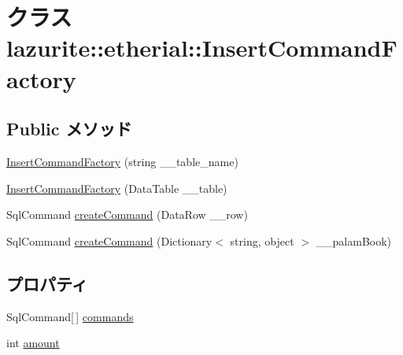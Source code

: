 \hypertarget{classlazurite_1_1etherial_1_1_insert_command_factory}{
\section{クラス lazurite::etherial::InsertCommandFactory}
\label{classlazurite_1_1etherial_1_1_insert_command_factory}
}
\subsection*{Public メソッド}
\begin{DoxyCompactItemize}
\item 
\hyperlink{classlazurite_1_1etherial_1_1_insert_command_factory_a681d2280ea017a412278b245a793411b}{InsertCommandFactory} (string \_\-\_\-table\_\-name)
\item 
\hyperlink{classlazurite_1_1etherial_1_1_insert_command_factory_abbb5bc3f37b1172a650e35350b53c7e6}{InsertCommandFactory} (DataTable \_\-\_\-table)
\item 
SqlCommand \hyperlink{classlazurite_1_1etherial_1_1_insert_command_factory_a3b7a7b125dcbd2831a351b4a0bdc901f}{createCommand} (DataRow \_\-\_\-row)
\item 
SqlCommand \hyperlink{classlazurite_1_1etherial_1_1_insert_command_factory_a0283f97acc2a08ba94318164d9bb20de}{createCommand} (Dictionary$<$ string, object $>$ \_\-\_\-palamBook)
\end{DoxyCompactItemize}
\subsection*{プロパティ}
\begin{DoxyCompactItemize}
\item 
SqlCommand\mbox{[}$\,$\mbox{]} \hyperlink{classlazurite_1_1etherial_1_1_insert_command_factory_aa678220213402cdb7f9830042b271a2f}{commands}
\item 
int \hyperlink{classlazurite_1_1etherial_1_1_insert_command_factory_a1a4306715cc6a503e8e5e8e20b4fb318}{amount}
\end{DoxyCompactItemize}


